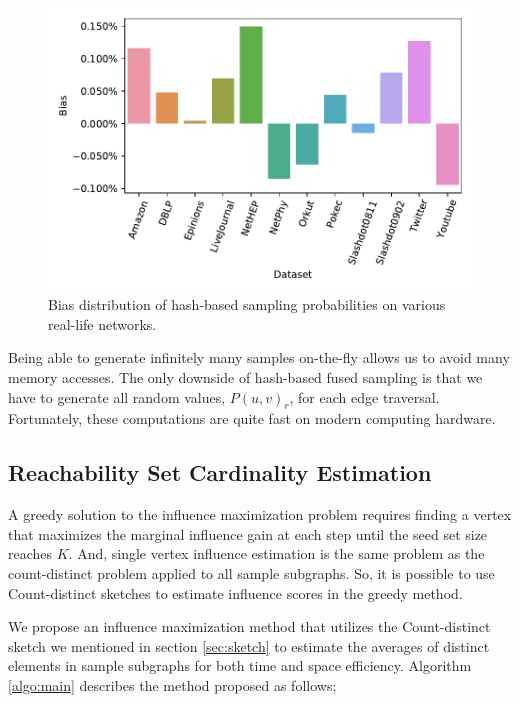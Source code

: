 \documentclass[10pt,journal,compsoc]{IEEEtran}
\begin{document}
\begin{figure}[!ht] 
    \centering
    \includegraphics[width=1\linewidth]{./images/bias.pdf}
    \caption{Bias distribution of hash-based sampling probabilities on various real-life networks.}
    \label{fig:prob-bias} 
\end{figure}

Being able to generate infinitely many samples on-the-fly allows us to avoid many memory accesses. The only downside of hash-based fused sampling is that we have to generate all random values,   $P(u,v)_r$, for each edge traversal.  Fortunately, these computations are quite fast on modern computing hardware.

\subsection{Reachability Set Cardinality Estimation}
A greedy solution to the influence maximization problem requires finding a vertex that maximizes the marginal influence gain at each step until the seed set size reaches $K$. And, single vertex influence estimation is the same problem as the count-distinct problem applied to all sample subgraphs. So, it is possible to use Count-distinct sketches to estimate influence scores in the greedy method. 

We propose an influence maximization method that utilizes the Count-distinct sketch we mentioned in section \ref{sec:sketch} to estimate the averages of distinct elements in sample subgraphs for both time and space efficiency. Algorithm \ref{algo:main} describes the method proposed as follows; 
\end{document}
